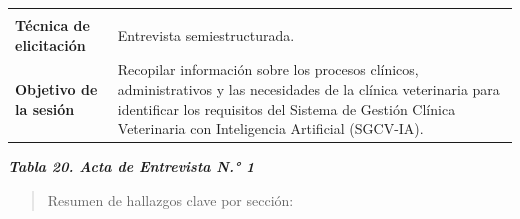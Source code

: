 \documentclass[
]{article}
\begin{document}
{\begin{longtable}[]{@{}
  >{\raggedright\arraybackslash}p{}
  >{\raggedright\arraybackslash}p{}@{}}
\begin{minipage}[t]{\linewidth}
\end{minipage} \\
\textbf{Técnica de elicitación} &
\begin{minipage}[t]{\linewidth}\raggedright
Entrevista semiestructurada.
\end{minipage} \\
\textbf{Objetivo de la sesión} &
\begin{minipage}[t]{\linewidth}\raggedright
Recopilar información sobre los procesos clínicos, administrativos y las
necesidades de la clínica veterinaria para identificar los requisitos
del Sistema de Gestión Clínica Veterinaria con Inteligencia Artificial
(SGCV-IA).
\end{minipage} \\
\end{longtable}
}

\protect{}\label{_bookmark79}{}\emph{\textbf{Tabla 20. Acta
de Entrevista N.° 1}}

\begin{quote}
Resumen de hallazgos clave por sección:
\end{quote}
\end{document}
